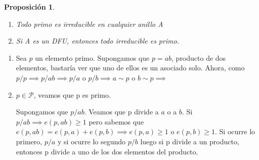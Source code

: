 \documentclass[11pt, a4paper, titlepage]{article}
\makeatletter
\renewenvironment{proof}[1][\proofname] {\vspace{-15pt}\par\pushQED{\qed}\normalfont\topsep6\p@\@plus6\p@\relax\trivlist\item[\hskip\labelsep\it#1\@addpunct{.}]\ignorespaces}{\popQED\endtrivlist\@endpefalse}
\theoremstyle{theorem-style}
\newtheorem*{nprop}{Proposición}
\theoremstyle{definition-style}
\theoremstyle{remark-style}
\theoremstyle{example-style}
\newenvironment{nlist}
{\begin{enumerate}
\renewcommand\labelenumi{(\emph{\roman{enumi})}}}
{\end{enumerate}}
\makeatother
\begin{document}
\begin{nprop}
\begin{nlist}
	\item Todo primo es irreducible en cualquier anillo A
	\item Si A es un DFU, entonces todo irreducible es primo.
\end{nlist}
\end{nprop}
\begin{proof}
	\begin{nlist}
	\item Sea $p$ un elemento primo. Supongamos que $p=ab$, producto de dos elementos, bastaría ver que uno de ellos es un asociado solo. Ahora, como $p/p \implies p/ab \implies  p/a $ o $p/b \implies a \sim p$ o $b \sim p \implies $
	
	\item $p \in \mathcal{P}$, veamos que p es primo.
	
Supongamos que $p/ab$. Veamos que p divide a $a$ o a $b$. 
Si $p/ab\implies e(p,ab) \geq 1$ pero sabemos que $e(p,ab) = e(p,a)+e(p,b) \implies e(p,a) \geq 1$ o $e(p,b) \geq 1$. Si ocurre lo primero, $p/a$ y si ocurre lo segundo $p/b$ luego si p divide a un producto, entonces p divide a uno de los dos elementos del producto.
\end{nlist}
\end{proof}
\end{document}
